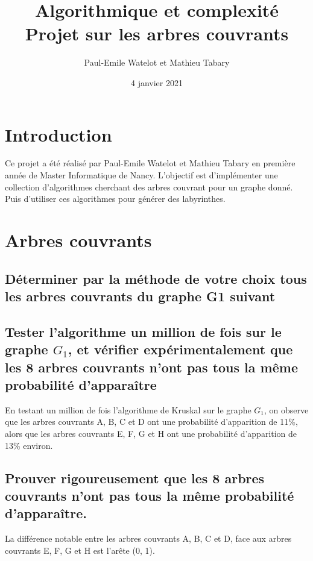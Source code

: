 \documentclass[11pt]{article}
\title{Algorithmique et complexité Projet sur les arbres couvrants}
\author{Paul-Emile Watelot et Mathieu Tabary}
\date{4 janvier 2021}
\begin{document}
    \maketitle

    \section{Introduction}\label{sec:introduction}
        Ce projet a été réalisé par Paul-Emile Watelot et Mathieu Tabary en première année de Master Informatique de Nancy.
        L'objectif est d'implémenter une collection d'algorithmes cherchant des arbres couvrant pour un graphe donné.
        Puis d'utiliser ces algorithmes pour générer des labyrinthes.
    
    \section{Arbres couvrants}\label{sec:arbres-couvrants}
        \subsection{Déterminer par la méthode de votre choix tous les arbres couvrants du graphe G1 suivant}\label{subsec:Q1}
        
        \newpage

        \subsection{Tester l'algorithme un million de fois sur le graphe $G_1$,
        et vérifier expérimentalement que les 8 arbres couvrants n'ont pas tous la même probabilité d'apparaître}\label{subsec:Q3}
            En testant un million de fois l'algorithme de Kruskal sur le graphe $G_1$,
            on observe que les arbres couvrants A, B, C et D ont une probabilité d'apparition de 11\%,
            alors que les arbres couvrants E, F, G et H ont une probabilité d'apparition de 13\% environ.
    
        \subsection{Prouver rigoureusement que les 8 arbres couvrants n'ont pas tous la même probabilité d'apparaître.}\label{subsec:Q4}
            La différence notable entre les arbres couvrants A, B, C et D, face aux arbres couvrants E, F, G et H est l'arête (0, 1).
\end{document}

